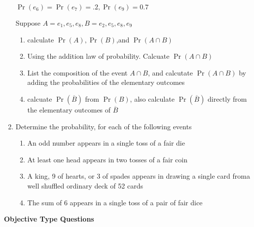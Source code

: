 \documentclass[12pt]{article}
\providecommand{\pr}[1]{\ensuremath{\Pr\left(#1\right)}}
\begin{document}
\begin{enumerate}
$\pr{e_6}=\pr{e_7}=.2,\pr{e_9}=0.7$

Suppose $A={e_1,e_5,e_8},B={e_2,e_5,e_8,e_9}$
\begin{enumerate}
\item calculate $\pr {A},\pr{B}$,and $\pr {A\cap B}$
\item Using the addition law of probability. Calcuate $\pr {A\cap B}$
\item List the composition of the event $A\cap B$, and calcutate $\pr {A\cap B}$ by adding the probabilities of the elementary outcomes
\item calcuate $\pr {\overline{B}}$ from $\pr {B}$, also calculate $\pr {\overline{B}}$ directly from the elementary outcomes of $\overline{B}$
\end{enumerate}
\item Determine the probability, for each of the following events 
	\begin{enumerate}
\item An odd number appears in a single toss of a fair die
\item At least one head appears in two tosses of a fair coin 
\item A king, 9 of hearts, or 3 of spades appears in drawing a single card froma well shuffled ordinary deck of 52 cards
\item The sum of 6 appears in a single toss of a pair of fair dice
	\end{enumerate}
	\end{enumerate}
\textbf{Objective Type Questions}
\end{document}
